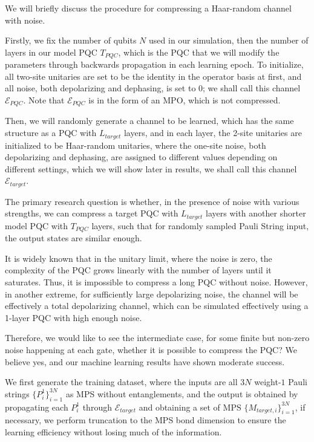 \documentclass[%
 reprint,
superscriptaddress,
 amsmath,amssymb,
 aps,
]{revtex4-2}
\newcommand{\E}{\mathcal{E}}
\begin{document}
We will briefly discuss the procedure for compressing a Haar-random channel with noise. 

Firstly, we fix the number of qubits $N$ used in our simulation, then the number of layers in our model PQC $T_{PQC}$, which is the PQC that we will modify the parameters through backwards propagation in each learning epoch. To initialize, all two-site unitaries are set to be the identity in the operator basis at first, and all noise, both depolarizing and dephasing, is set to 0; we shall call this channel $\E_{PQC}$. Note that $\E_{PQC}$ is in the form of an MPO, which is not compressed.

Then, we will randomly generate a channel to be learned, which has the same structure as a PQC with $L_{target}$ layers, and in each layer, the 2-site unitaries are initialized to be Haar-random unitaries, where the one-site noise, both depolarizing and dephasing, are assigned to different values depending on different settings, which we will show later in results, we shall call this channel $\E_{target}$.

The primary research question is whether, in the presence of noise with various strengths, we can compress a target PQC with $L_{target}$ layers with another shorter model PQC with $T_{PQC}$ layers, such that for randomly sampled Pauli String input, the output states are similar enough.

It is widely known that in the unitary limit, where the noise is zero, the complexity of the PQC grows linearly with the number of layers until it saturates. Thus, it is impossible to compress a long PQC without noise. However, in another extreme, for sufficiently large depolarizing noise, the channel will be effectively a total depolarizing channel, which can be simulated effectively using a 1-layer PQC with high enough noise.

Therefore, we would like to see the intermediate case, for some finite but non-zero noise happening at each gate, whether it is possible to compress the PQC? We believe yes, and our machine learning results have shown moderate success. 

We first generate the training dataset, where the inputs are all $3N$ weight-$1$ Pauli strings $\{P^1_{i}\}_{i=1}^{3N}$ as MPS without entanglements, and the output is obtained by propagating each $P^1_i$ through $\E_{target}$ and obtaining a set of MPS $\{M_{target, i}\}_{i=1}^{3N}$, if necessary, we perform truncation to the MPS bond dimension to ensure the learning efficiency without losing much of the information.
\end{document}
